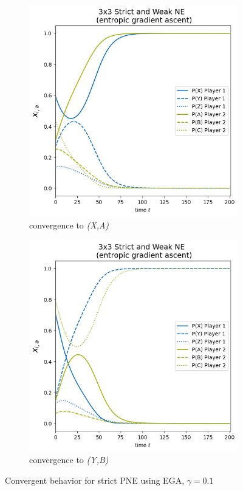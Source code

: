 \begin{figure}[H]
\captionsetup{justification=centering}
\centering
\begin{subfigure}{.5\textwidth}
    \centering
    \includegraphics[width=\textwidth]{logos/Weak3x3a.png}
    \caption{convergence to \textit{(X,A)}}
    \label{fig:Weak3x3a}
\end{subfigure}%
\begin{subfigure}{.5\textwidth}
    \centering
    \includegraphics[width=\textwidth]{logos/Weak3x3b.png}
    \caption{convergence to \textit{(Y,B)}}
    \label{fig:Weak3x3b}
\end{subfigure}
\caption{Convergent behavior for strict PNE using EGA, $\gamma = 0.1$}
\label{fig:Weak3x3}
\end{figure}

